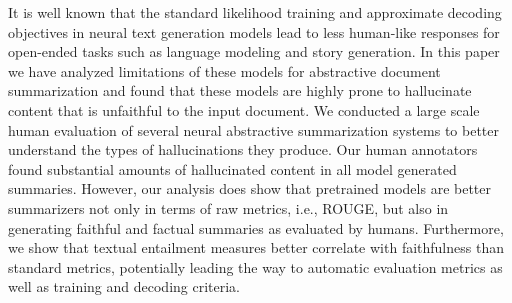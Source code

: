It is well known that the standard likelihood training and approximate decoding objectives in neural text generation models lead to less human-like responses for open-ended tasks such as language modeling and story generation. In this paper we have analyzed limitations of these models for abstractive document summarization and found that these models are highly prone to hallucinate content that is  unfaithful to the input document. We conducted a large scale human evaluation of several neural abstractive summarization systems to better understand the types of hallucinations they produce. Our human annotators found substantial amounts of hallucinated content in all model generated summaries. However, our analysis does show that pretrained models are better summarizers not only in terms of raw metrics, i.e., ROUGE, but also in generating faithful and factual summaries as evaluated by humans. Furthermore, we show that textual entailment measures better correlate with faithfulness than standard metrics, potentially leading the way to automatic evaluation metrics as well as training and decoding criteria.
